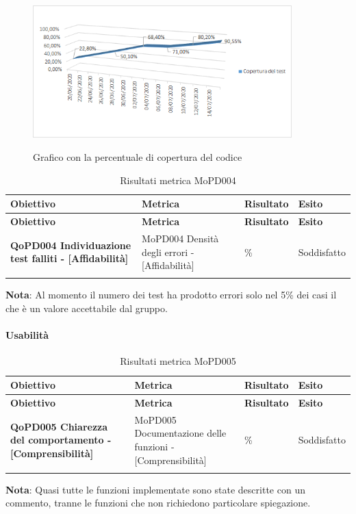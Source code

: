\begin{figure}[H]
  \centering
  \includegraphics[width=10cm]{img/coperturaTest.png}
  \label{fig:test_implementati}
  \caption{Grafico con la percentuale di copertura del codice}
\end{figure}

\renewcommand{\arraystretch}{2} %
\begin{longtable}[H]{>{\centering\bfseries}m{5cm} >{\centering}m{5cm} >{\centering}m{2.5cm} >{\centering\arraybackslash}m{2.5cm}}  
  \rowcolor{lightgray}
  {\textbf{Obiettivo}} & {\textbf{Metrica}} & {\textbf{Risultato}} & {\textbf{Esito}}  \\
  \endfirsthead%
  \rowcolor{lightgray}
  {\textbf{Obiettivo}} & {\textbf{Metrica}} & {\textbf{Risultato}} & {\textbf{Esito}}  \\
  \endhead%
  \textbf{QoPD004 Individuazione test falliti - [Affidabilità]} & MoPD004 Densità degli errori - [Affidabilità] & 5\% & Soddisfatto \\
  \caption{Risultati metrica MoPD004}
  \label{tab:my-table}
\end{longtable}
\textbf{Nota}: Al momento il numero dei test ha prodotto errori solo nel 5\% dei casi il che è un valore accettabile dal gruppo.

\paragraph{Usabilità}
\label{sub:usabilita}

\renewcommand{\arraystretch}{2} %
\begin{longtable}[H]{>{\centering\bfseries}m{5cm} >{\centering}m{5cm} >{\centering}m{2.5cm} >{\centering\arraybackslash}m{2.5cm}}  
  \rowcolor{lightgray}
  {\textbf{Obiettivo}} & {\textbf{Metrica}} & {\textbf{Risultato}} & {\textbf{Esito}}  \\
  \endfirsthead%
  \rowcolor{lightgray}
  {\textbf{Obiettivo}} & {\textbf{Metrica}} & {\textbf{Risultato}} & {\textbf{Esito}}  \\
  \endhead%
  \textbf{QoPD005 Chiarezza del comportamento - [Comprensibilità]} & MoPD005 Documentazione delle funzioni - [Comprensibilità] & 90\%  & Soddisfatto \\
  \caption{Risultati metrica MoPD005}
  \label{tab:my-table}
\end{longtable}
\textbf{Nota}: Quasi tutte le funzioni implementate sono state descritte con un commento, tranne le funzioni che non richiedono particolare spiegazione.

